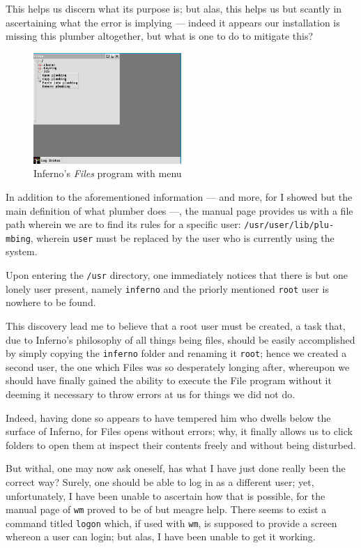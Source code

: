 \documentclass[a5paper,twoside,12pt]{report}
\begin{document}
  This helps us discern what its purpose is; but alas, this helps us but scantly in ascertaining what the error is implying — indeed it appears our installation is missing this plumber altogether, but what is one to do to mitigate this?

  \begin{figure}
    \centering
    \includegraphics[width=0.5\textwidth]{imgs/files-menu.png}
    \caption{Inferno's \textit{Files} program with menu}
  \end{figure}

  In addition to the aforementioned information — and more, for I showed but the main definition of what plumber does —, the manual page provides us with a file path wherein we are to find its rules for a specific user: \texttt{/usr/user/lib/plu-\\mbing}, wherein \texttt{user} must be replaced by the user who is currently using the system.

  Upon entering the \texttt{/usr} directory, one immediately notices that there is but one lonely user present, namely \texttt{inferno} and the priorly mentioned \texttt{root} user is nowhere to be found.

  This discovery lead me to believe that a root user must be created, a task that, due to Inferno's philosophy of all things being files, should be easily accomplished by simply copying the \texttt{inferno} folder and renaming it \texttt{root}; hence we created a second user, the one which Files was so desperately longing after, whereupon we should have finally gained the ability to execute the File program without it deeming it necessary to throw errors at us for things we did not do.

  Indeed, having done so appears to have tempered him who dwells below the surface of Inferno, for Files opens without errors; why, it finally allows us to click folders to open them at inspect their contents freely and without being disturbed.

  But withal, one may now ask oneself, has what I have just done really been the correct way? Surely, one should be able to log in as a different user; yet, unfortunately, I have been unable to ascertain how that is possible, for the manual page of \texttt{wm} proved to be of but meagre help. There seems to exist a command titled \texttt{logon} which, if used with \texttt{wm}, is supposed to provide a screen whereon a user can login; but alas, I have been unable to get it working.
\end{document}
